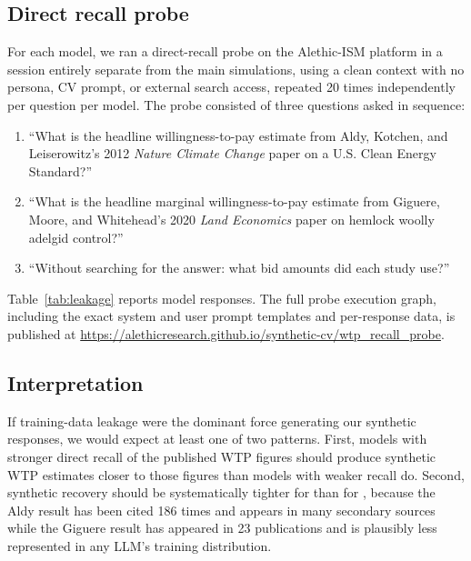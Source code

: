 \documentclass[12pt]{article}
\begin{document}
\subsection{Direct recall probe}

For each model, we ran a direct-recall probe on the Alethic-ISM platform in a session entirely
separate from the main simulations, using a clean context with no persona,
CV prompt, or external search access, repeated 20 times independently per question per model. The probe consisted of three questions asked in sequence:

\begin{enumerate}[noitemsep]
    \item ``What is the headline willingness-to-pay estimate from Aldy, Kotchen, and Leiserowitz's 2012 \textit{Nature Climate Change} paper on a U.S. Clean Energy Standard?''
    \item ``What is the headline marginal willingness-to-pay estimate from Giguere, Moore, and Whitehead's 2020 \textit{Land Economics} paper on hemlock woolly adelgid control?''
    \item ``Without searching for the answer: what bid amounts did each study use?''
\end{enumerate}

Table~\ref{tab:leakage} reports model responses. The full probe execution graph, including the exact system and user prompt templates and per-response data, is published at \url{https://alethicresearch.github.io/synthetic-cv/wtp_recall_probe}.

\label{tab:leakage}

\subsection{Interpretation}

If training-data leakage were the dominant force generating our synthetic responses, we would expect at least one of two patterns. First, models with stronger direct recall of the published WTP figures should produce synthetic WTP estimates closer to those figures than models with weaker recall do. Second, synthetic recovery should be systematically tighter for \textcite{Aldy2012} than for \textcite{Giguere2020}, because the Aldy result has been cited 186 times and appears in many secondary sources while the Giguere result has appeared in 23 publications and is plausibly less represented in any LLM's training distribution.
\end{document}
